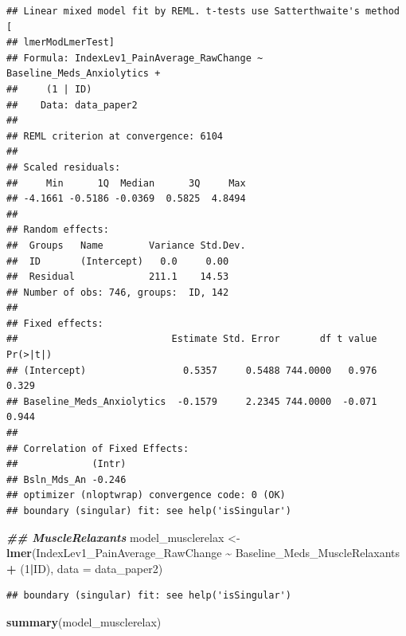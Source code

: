 \documentclass[
  12pt,
]{article}
\newenvironment{Shaded}{\begin{snugshade}}{\end{snugshade}}
\newcommand{\AttributeTok}[1]{\textcolor[rgb]{0.13,0.29,0.53}{#1}}
\newcommand{\DecValTok}[1]{\textcolor[rgb]{0.00,0.00,0.81}{#1}}
\newcommand{\DocumentationTok}[1]{\textcolor[rgb]{0.56,0.35,0.01}{\textbf{\textit{#1}}}}
\newcommand{\FunctionTok}[1]{\textcolor[rgb]{0.13,0.29,0.53}{\textbf{#1}}}
\newcommand{\NormalTok}[1]{#1}
\newcommand{\OtherTok}[1]{\textcolor[rgb]{0.56,0.35,0.01}{#1}}
\newcommand{\SpecialCharTok}[1]{\textcolor[rgb]{0.81,0.36,0.00}{\textbf{#1}}}
\begin{document}
\begin{verbatim}
## Linear mixed model fit by REML. t-tests use Satterthwaite's method [
## lmerModLmerTest]
## Formula: IndexLev1_PainAverage_RawChange ~ Baseline_Meds_Anxiolytics +  
##     (1 | ID)
##    Data: data_paper2
## 
## REML criterion at convergence: 6104
## 
## Scaled residuals: 
##     Min      1Q  Median      3Q     Max 
## -4.1661 -0.5186 -0.0369  0.5825  4.8494 
## 
## Random effects:
##  Groups   Name        Variance Std.Dev.
##  ID       (Intercept)   0.0     0.00   
##  Residual             211.1    14.53   
## Number of obs: 746, groups:  ID, 142
## 
## Fixed effects:
##                           Estimate Std. Error       df t value Pr(>|t|)
## (Intercept)                 0.5357     0.5488 744.0000   0.976    0.329
## Baseline_Meds_Anxiolytics  -0.1579     2.2345 744.0000  -0.071    0.944
## 
## Correlation of Fixed Effects:
##             (Intr)
## Bsln_Mds_An -0.246
## optimizer (nloptwrap) convergence code: 0 (OK)
## boundary (singular) fit: see help('isSingular')
\end{verbatim}

\begin{Shaded}
\begin{Highlighting}[]
\DocumentationTok{\#\# MuscleRelaxants}
\NormalTok{model\_musclerelax }\OtherTok{\textless{}{-}} \FunctionTok{lmer}\NormalTok{(IndexLev1\_PainAverage\_RawChange }\SpecialCharTok{\textasciitilde{}}\NormalTok{ Baseline\_Meds\_MuscleRelaxants }\SpecialCharTok{+}\NormalTok{ (}\DecValTok{1}\SpecialCharTok{|}\NormalTok{ID), }\AttributeTok{data =}\NormalTok{ data\_paper2)}
\end{Highlighting}
\end{Shaded}

\begin{verbatim}
## boundary (singular) fit: see help('isSingular')
\end{verbatim}

\begin{Shaded}
\begin{Highlighting}[]
\FunctionTok{summary}\NormalTok{(model\_musclerelax)}
\end{Highlighting}
\end{Shaded}
\end{document}
